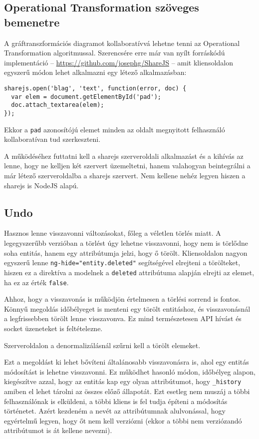 \subsection{Operational Transformation szöveges bemenetre}

A gráftranszformációs diagramot kollaboratívvá lehetne tenni az Operational Transformation algoritmussal. Szerencsére erre már van nyílt forráskódú implementáció -- \url{https://github.com/josephg/ShareJS} -- amit kliensoldalon egyszerű módon lehet alkalmazni egy létező alkalmazásban:

\begin{lstlisting}
sharejs.open('blag', 'text', function(error, doc) {
  var elem = document.getElementById('pad');
  doc.attach_textarea(elem);
});
\end{lstlisting} 

Ekkor a \lstinline{pad} azonosítójú elemet minden az oldalt megnyitott felhasználó kollaboratívan tud szerkeszteni. 

A működéséhez futtatni kell a sharejs szerveroldali alkalmazást és a kihívás az lenne, hogy ne kelljen két szervert üzemeltetni, hanem valahogyan beintegrálni a már létező szerveroldalba a sharejs szervert. Nem kellene nehéz legyen hiszen a sharejs is NodeJS alapú.

\subsection{Undo}

Hasznos lenne visszavonni változásokat, főleg a véletlen törlés miatt. A legegyszerűbb verzióban a törlést úgy lehetne visszavonni, hogy nem is törlődne soha entitás, hanem egy attribútumja jelzi, hogy ő törölt. Kliensoldalon nagyon egyszerű lenne \lstinline{ng-hide="entity.deleted"} segítségével elrejteni a törölteket, hiszen ez a direktíva a modelnek a \lstinline{deleted} attribútuma alapján elrejti az elemet, ha ez az érték \lstinline{false}. 

Ahhoz, hogy a visszavonás is működjön értelmesen a törlési sorrend is fontos. Könnyű megoldás időbélyeget is menteni egy törölt entitáshoz, és visszavonásnál a legfrissebben törölt lenne visszavonva. Ez mind természetesen API hívást és socket üzeneteket is feltételezne.

Szerveroldalon a denormalizálásnál szűrni kell a törölt elemeket.

Ezt a megoldást ki lehet bővíteni általánosabb visszavonásra is, ahol egy entitás módosítást is lehetne visszavonni. Ez működhet hasonló módon, időbélyeg alapon, kiegészítve azzal, hogy az entitás kap egy olyan attribútumot, hogy \lstinline{_history} amiben el lehet tárolni az összes előző állapotát. Ezt esetleg nem muszáj a többi felhasználónak is elküldeni, a többi kliens is fel tudja építeni a módosítás történetet. Azért kezdeném a nevét az attribútumnak alulvonással, hogy egyértelmű legyen, hogy őt nem kell verziózni (ekkor a többi nem verziózandó attribútumot is át kellene nevezni).

